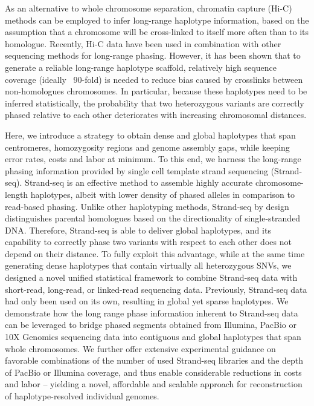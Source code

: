 As an alternative to whole chromosome separation, chromatin capture (Hi-C) methods can be employed to infer long-range haplotype information, based on the assumption that a chromosome will be cross-linked to itself more often than to its homologue.
Recently, Hi-C data have been used in combination with other sequencing methods for long-range phasing. 
However, it has been shown that to generate a reliable long-range haplotype scaffold, relatively high sequence coverage (ideally ~90-fold) is needed to reduce bias caused by crosslinks between non-homologues chromosomes. 
In particular, because these haplotypes need to be inferred statistically, the probability that two heterozygous variants are correctly phased relative to each other deteriorates with increasing chromosomal distances.


Here, we introduce a strategy to obtain dense and global haplotypes that span centromeres, homozygosity regions and genome assembly gaps, while keeping error rates, costs and labor at minimum. 
To this end, we harness the long-range phasing information provided by single cell template strand sequencing (Strand-seq). Strand-seq is an effective method to assemble highly 
accurate chromosome-length haplotypes, albeit with lower density of phased alleles in comparison to read-based phasing. 
Unlike other haplotyping methods, Strand-seq by design distinguishes parental homologues based on the directionality of single-stranded DNA. 
Therefore, Strand-seq is able to deliver global haplotypes, and its capability to correctly phase two variants with respect to each other does not depend on their distance. 
To fully exploit this advantage, while at the same time generating dense haplotypes that contain virtually all heterozygous SNVs, we designed a novel unified statistical framework to combine 
Strand-seq data with short-read, long-read, or linked-read sequencing data. 
Previously, Strand-seq data had only been used on its own, resulting in global yet sparse haplotypes. 
We demonstrate how the long range phase information inherent to Strand-seq data can be leveraged to bridge phased segments obtained from Illumina, PacBio or 10X Genomics sequencing data into contiguous and global haplotypes that span whole chromosomes.
We further offer extensive experimental guidance on favorable combinations of the number of used Strand-seq libraries and the depth of PacBio or Illumina coverage, 
and thus enable considerable reductions in costs and labor – yielding a novel, affordable and scalable approach for reconstruction of haplotype-resolved individual genomes.


